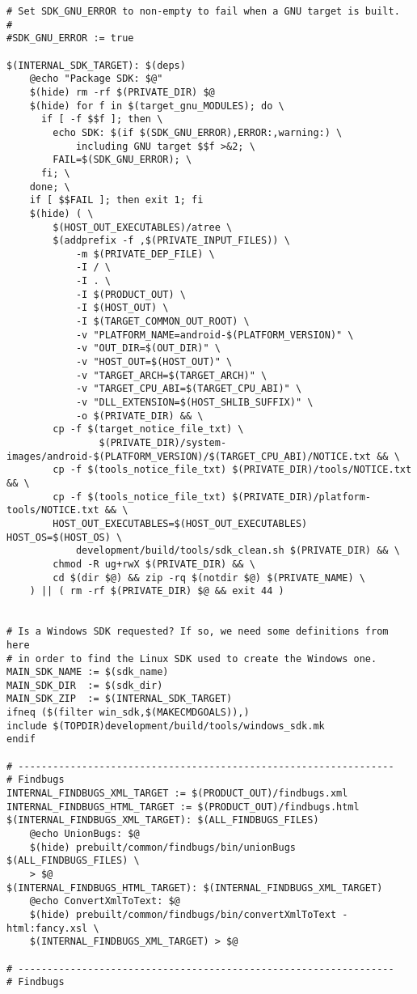\documentclass[12pt,a4paper]{article}
\begin{document}
\begin{verbatim}
# Set SDK_GNU_ERROR to non-empty to fail when a GNU target is built.
#
#SDK_GNU_ERROR := true

$(INTERNAL_SDK_TARGET): $(deps)
	@echo "Package SDK: $@"
	$(hide) rm -rf $(PRIVATE_DIR) $@
	$(hide) for f in $(target_gnu_MODULES); do \
	  if [ -f $$f ]; then \
	    echo SDK: $(if $(SDK_GNU_ERROR),ERROR:,warning:) \
	        including GNU target $$f >&2; \
	    FAIL=$(SDK_GNU_ERROR); \
	  fi; \
	done; \
	if [ $$FAIL ]; then exit 1; fi
	$(hide) ( \
		$(HOST_OUT_EXECUTABLES)/atree \
		$(addprefix -f ,$(PRIVATE_INPUT_FILES)) \
			-m $(PRIVATE_DEP_FILE) \
			-I / \
			-I . \
			-I $(PRODUCT_OUT) \
			-I $(HOST_OUT) \
			-I $(TARGET_COMMON_OUT_ROOT) \
			-v "PLATFORM_NAME=android-$(PLATFORM_VERSION)" \
			-v "OUT_DIR=$(OUT_DIR)" \
			-v "HOST_OUT=$(HOST_OUT)" \
			-v "TARGET_ARCH=$(TARGET_ARCH)" \
			-v "TARGET_CPU_ABI=$(TARGET_CPU_ABI)" \
			-v "DLL_EXTENSION=$(HOST_SHLIB_SUFFIX)" \
			-o $(PRIVATE_DIR) && \
		cp -f $(target_notice_file_txt) \
				$(PRIVATE_DIR)/system-images/android-$(PLATFORM_VERSION)/$(TARGET_CPU_ABI)/NOTICE.txt && \
		cp -f $(tools_notice_file_txt) $(PRIVATE_DIR)/tools/NOTICE.txt && \
		cp -f $(tools_notice_file_txt) $(PRIVATE_DIR)/platform-tools/NOTICE.txt && \
		HOST_OUT_EXECUTABLES=$(HOST_OUT_EXECUTABLES) HOST_OS=$(HOST_OS) \
			development/build/tools/sdk_clean.sh $(PRIVATE_DIR) && \
		chmod -R ug+rwX $(PRIVATE_DIR) && \
		cd $(dir $@) && zip -rq $(notdir $@) $(PRIVATE_NAME) \
	) || ( rm -rf $(PRIVATE_DIR) $@ && exit 44 )


# Is a Windows SDK requested? If so, we need some definitions from here
# in order to find the Linux SDK used to create the Windows one.
MAIN_SDK_NAME := $(sdk_name)
MAIN_SDK_DIR  := $(sdk_dir)
MAIN_SDK_ZIP  := $(INTERNAL_SDK_TARGET)
ifneq ($(filter win_sdk,$(MAKECMDGOALS)),)
include $(TOPDIR)development/build/tools/windows_sdk.mk
endif

# -----------------------------------------------------------------
# Findbugs
INTERNAL_FINDBUGS_XML_TARGET := $(PRODUCT_OUT)/findbugs.xml
INTERNAL_FINDBUGS_HTML_TARGET := $(PRODUCT_OUT)/findbugs.html
$(INTERNAL_FINDBUGS_XML_TARGET): $(ALL_FINDBUGS_FILES)
	@echo UnionBugs: $@
	$(hide) prebuilt/common/findbugs/bin/unionBugs $(ALL_FINDBUGS_FILES) \
	> $@
$(INTERNAL_FINDBUGS_HTML_TARGET): $(INTERNAL_FINDBUGS_XML_TARGET)
	@echo ConvertXmlToText: $@
	$(hide) prebuilt/common/findbugs/bin/convertXmlToText -html:fancy.xsl \
	$(INTERNAL_FINDBUGS_XML_TARGET)	> $@

# -----------------------------------------------------------------
# Findbugs


\end{verbatim}
\end{document}
